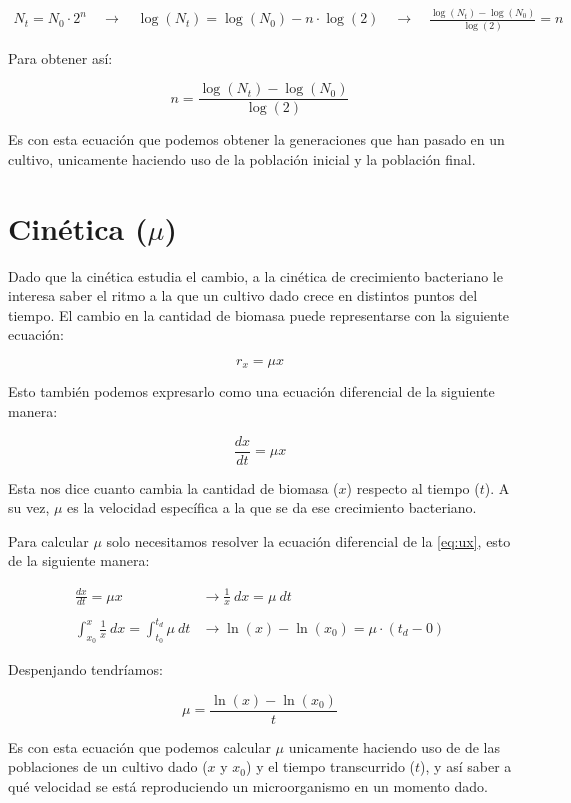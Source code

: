 \begin{align*}
    N_{t} = N_{0} \cdot 2^{n} \quad \longrightarrow \quad \log(N_{t}) = \log(N_{0}) - n \cdot \log(2) \quad \longrightarrow \quad \frac{\log(N_{t}) - \log(N_{0})}{\log(2)} = n
\end{align*}

Para obtener así:

\begin{equation}\label{eq:n}
    n = \frac{\log(N_{t}) - \log(N_{0})}{\log(2)}
\end{equation}

Es con esta ecuación que podemos obtener la generaciones que han pasado en un cultivo, unicamente haciendo uso de la población inicial y la población final.

\section{Cinética ($\mu$)}

Dado que la cinética estudia el cambio, a la cinética de crecimiento bacteriano le interesa saber el ritmo a la que un cultivo dado crece en distintos puntos del tiempo. El cambio en la cantidad de biomasa puede representarse con la siguiente ecuación:

\begin{equation*}
    r_{x} = \mu x
\end{equation*}

Esto también podemos expresarlo como una ecuación diferencial de la siguiente manera:

\begin{equation}\label{eq:ux}
    \frac{dx}{dt} = \mu x
\end{equation}

Esta nos dice cuanto cambia la cantidad de biomasa ($x$) respecto al tiempo ($t$). A su vez, $\mu$ es la velocidad específica a la que se da ese crecimiento bacteriano.

Para calcular $\mu$ solo necesitamos resolver la ecuación diferencial de la \autoref{eq:ux}, esto de la siguiente manera:

\begin{align*}
    \frac{dx}{dt} = \mu x & \longrightarrow \frac{1}{x} \ dx = \mu \ dt
    \\
    \\
    \int_{x_{0}}^{x}{\frac{1}{x}} \ dx = \int_{t_{0}}^{t_{d}}{\mu \ dt} &\longrightarrow \ln(x) - \ln(x_{0}) = \mu \cdot (t_{d} - 0)
\end{align*}

Despenjando tendríamos:

\begin{equation}
    \mu = \frac{\ln(x) - \ln(x_{0})}{t}
\end{equation}

Es con esta ecuación que podemos calcular $\mu$ unicamente haciendo uso de de las poblaciones de un cultivo dado ($x$ y $x_{0}$) y el tiempo transcurrido ($t$), y así saber a qué velocidad se está reproduciendo un microorganismo en un momento dado.